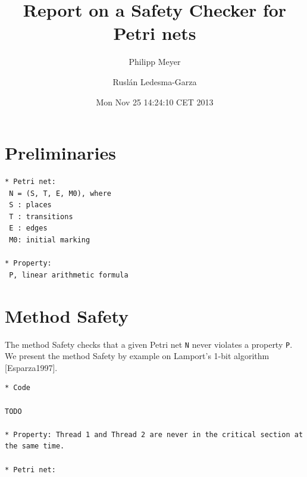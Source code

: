 \documentclass{article}
\begin{document}
\title{Report on a Safety Checker for Petri nets}
\author{Philipp Meyer \and Rusl\'{a}n Ledesma-Garza}
\date{Mon Nov 25 14:24:10 CET 2013}



\section{Preliminaries}


\begin{verbatim}
* Petri net:
 N = (S, T, E, M0), where
 S : places
 T : transitions
 E : edges
 M0: initial marking

* Property:
 P, linear arithmetic formula
\end{verbatim}

\newpage
\section{Method Safety}

The method Safety checks that a given Petri net \verb=N= never violates a property \verb=P=.
We present the method Safety by example on Lamport's 1-bit algorithm [Esparza1997].

\begin{verbatim}
* Code

TODO

* Property: Thread 1 and Thread 2 are never in the critical section at the same time.

* Petri net:

\end{verbatim}
\end{document}
